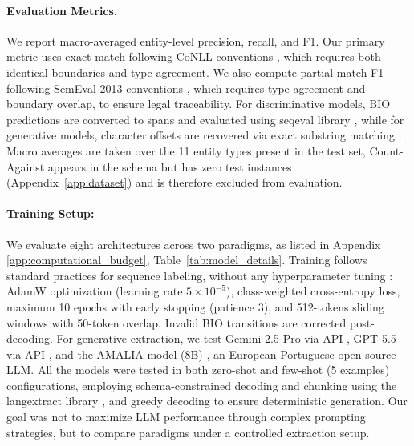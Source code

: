 \documentclass[11pt]{article}
\begin{document}

\paragraph{Evaluation Metrics.} We report macro-averaged entity-level precision, recall, and F1. Our primary metric uses exact match following CoNLL conventions \cite{tjong2003introduction}, which requires both identical boundaries and type agreement. We also compute partial match F1 following SemEval-2013 conventions \cite{segura-bedmar-etal-2013-semeval}, which requires type agreement and boundary overlap, to ensure legal traceability. For discriminative models, BIO predictions are converted to spans and evaluated using seqeval library \cite{seqeval}, while for generative models, character offsets are recovered via exact substring matching \cite{wang2023gptner}. Macro averages are taken over the 11 entity types present in the test set, Count-Against appears in the schema but has zero test instances (Appendix~\ref{app:dataset}) and is therefore excluded from evaluation.

\paragraph{Training Setup:} We evaluate eight architectures across two paradigms, as listed in Appendix \ref{app:computational_budget}, Table~\ref{tab:model_details}. Training follows standard practices for sequence labeling, without any hyperparameter tuning \cite{Bert-CRF-Souza}: AdamW optimization (learning rate \(5 \times 10^{-5}\)), class-weighted cross-entropy loss, maximum 10 epochs with early stopping (patience 3), and 512-tokens sliding windows with 50-token overlap. Invalid BIO transitions are corrected post-decoding. For generative extraction, we test Gemini 2.5 Pro via API \cite{gemini25}, GPT 5.5 via API \cite{openai_gpt55}, and the AMALIA model (8B) \cite{simplicio-etal-2026-amalia}, an European Portuguese open-source LLM. All the models were tested in both zero-shot and few-shot (5 examples) configurations, employing schema-constrained decoding and chunking using the langextract library \cite{Goel_LangExtract_2025}, and greedy decoding to ensure deterministic generation. Our goal was not to maximize LLM performance through complex prompting strategies, but to compare paradigms under a controlled extraction setup.
\end{document}

